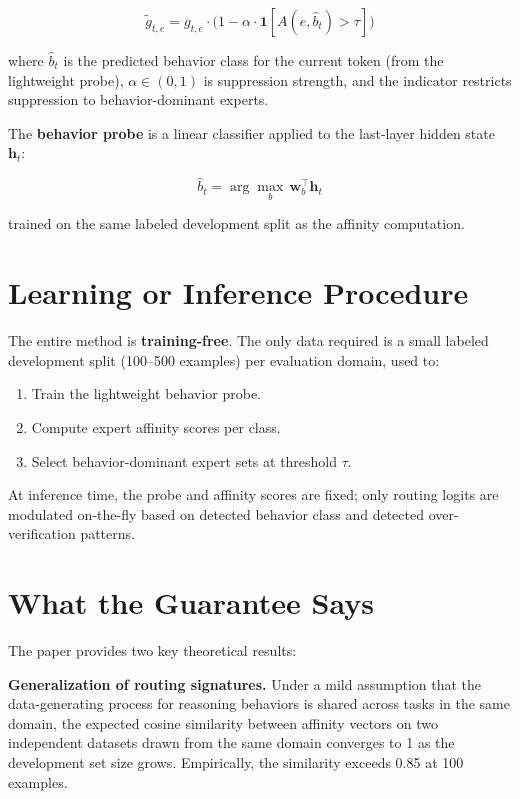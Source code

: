 \documentclass[10pt,twocolumn]{article}
\begin{document}
\begin{equation}
\tilde{g}_{t,e} = g_{t,e} \cdot \bigl(1 - \alpha \cdot \mathbf{1}[A(e,\hat{b}_t) > \tau]\bigr)
\end{equation}

where $\hat{b}_t$ is the predicted behavior class for the current token (from the lightweight probe), $\alpha \in (0,1)$ is suppression strength, and the indicator restricts suppression to behavior-dominant experts.

The \textbf{behavior probe} is a linear classifier applied to the last-layer hidden state $\mathbf{h}_t$:

\begin{equation}
\hat{b}_t = \arg\max_b \, \mathbf{w}_b^\top \mathbf{h}_t
\end{equation}

trained on the same labeled development split as the affinity computation.

\section{Learning or Inference Procedure}

The entire method is \textbf{training-free}.
The only data required is a small labeled development split (100--500 examples) per evaluation domain, used to:
\begin{enumerate}[leftmargin=1.5em,itemsep=1pt]
  \item Train the lightweight behavior probe.
  \item Compute expert affinity scores per class.
  \item Select behavior-dominant expert sets at threshold $\tau$.
\end{enumerate}
At inference time, the probe and affinity scores are fixed; only routing logits are modulated on-the-fly based on detected behavior class and detected over-verification patterns.

\section{What the Guarantee Says}

The paper provides two key theoretical results:

\textbf{Generalization of routing signatures.}
Under a mild assumption that the data-generating process for reasoning behaviors is shared across tasks in the same domain, the expected cosine similarity between affinity vectors on two independent datasets drawn from the same domain converges to 1 as the development set size grows.
Empirically, the similarity exceeds 0.85 at 100 examples.
\end{document}

